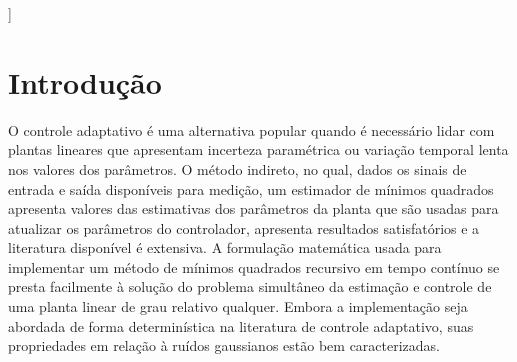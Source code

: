 \documentclass[conference,harvard,brazil,english]{sbatex}
\begin{document}
\begin{abstract}
  
  O uso do algoritmo de mínimos quadrados de tempo contínuo recursivo com fator de esquecimento como uma forma de estimar os parâmetros desconhecidos de um sistema linear tem sido uma ferramenta importante no campo do Controle Adaptativo por mais de 20 anos. O uso do erro quadrado como uma função de custo que precisa ser minimizada com respeito a um conjunto de parâmetros é bem conhecida na literatura e apresenta bons resultados numa variedade de aplicações. Matematicamente, tem boas propriedades quando a incerteza nos dados possui uma distribuição gaussiana. No entanto, pesquisadores no campo da Teoria da Informação têm apresentado descritores que melhor caracterizam os dados quando a incerteza tem distribuição não-gaussiana em algum sentido. Isto é certamente verdade em muitas aplicações de Controle Adaptativo, once o controlador precisa lidar com a mudança ao longo do tempo nos parâmetros planta e com condições de operações diferentes. Ruído e perturbação de entrada podem ser encontrados em uma variedade de formas, e apesar de algumas delas serem gaussianas, a maioria não o é.
  
  O objetivo deste trabalho é apresentar um algoritmo que traduza o conceito de Maximização da Correntropia para estimar em tempo real os parâmetros desconhecidos de um sistema LIT, e comparar estes resultados com os obtidos pelo algoritmo que minimiza o erro quadrado.
  
  
  
\end{abstract}

]



\section{Introdução}

O controle adaptativo é uma alternativa popular quando é necessário lidar com plantas lineares que apresentam incerteza paramétrica ou variação temporal lenta nos valores dos parâmetros. O método indireto, no qual, dados os sinais de entrada e saída disponíveis para medição, um estimador de mínimos quadrados apresenta valores das estimativas dos parâmetros da planta que são usadas para atualizar os parâmetros do controlador, apresenta resultados satisfatórios e a literatura disponível é extensiva. A formulação matemática usada para implementar um método de mínimos quadrados recursivo em tempo contínuo se presta facilmente à solução do problema simultâneo da estimação e controle de uma planta linear de grau relativo qualquer. Embora a implementação seja abordada de forma determinística na literatura de controle adaptativo, suas propriedades  em relação à ruídos gaussianos estão bem caracterizadas.\\  
\end{document}
